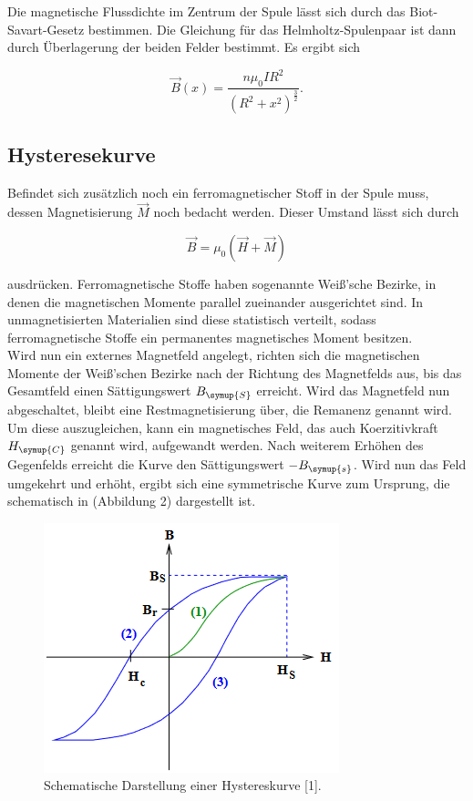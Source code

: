 \documentclass[
  bibliography=totoc,     %
  captions=tableheading,  %
  titlepage=firstiscover, %
]{scrartcl}
\begin{document}
  Die magnetische Flussdichte im Zentrum der Spule lässt sich durch das Biot-Savart-Gesetz bestimmen.
  Die Gleichung für das Helmholtz-Spulenpaar ist dann durch Überlagerung der beiden Felder bestimmt.
  Es ergibt sich
  
  \begin{equation}
    \label{eqn:helmholtz}
    \vec{B}(x) = \frac{n\mu_0 I R^2}{(R^2+x^2)^{\frac{3}{2}}}.
  \end{equation}

  \subsection{Hysteresekurve}
  \label{sec:hysterese}
  
  Befindet sich zusätzlich noch ein ferromagnetischer Stoff in der Spule muss, dessen Magnetisierung $\vec{M}$
  noch bedacht werden. Dieser Umstand lässt sich durch
  
  \begin{equation}
    \vec{B} = \mu_0 (\vec{H} + \vec{M})
  \end{equation}
  
  ausdrücken. Ferromagnetische Stoffe haben sogenannte Weiß'sche Bezirke, in denen die magnetischen
  Momente parallel zueinander ausgerichtet sind. In unmagnetisierten Materialien sind diese statistisch verteilt,
  sodass ferromagnetische Stoffe ein permanentes magnetisches Moment besitzen.\\
  Wird nun ein externes Magnetfeld angelegt, richten sich die magnetischen Momente der Weiß'schen Bezirke
  nach der Richtung des Magnetfelds aus, bis das Gesamtfeld einen Sättigungswert 
  $B_{\symup{S}}$ erreicht. Wird das Magnetfeld nun abgeschaltet, bleibt eine Restmagnetisierung
  über, die Remanenz genannt wird. Um diese auszugleichen, kann ein magnetisches Feld, das
  auch Koerzitivkraft $H_{\symup{C}}$ genannt wird, aufgewandt werden. Nach weiterem Erhöhen des Gegenfelds
  erreicht die Kurve den Sättigungswert $-B_{\symup{s}}$. Wird nun das Feld umgekehrt und erhöht, ergibt sich eine
  symmetrische Kurve zum Ursprung, die schematisch in (Abbildung 2) dargestellt ist.
  
  \begin{figure}
    \centering
    \includegraphics[scale=0.5]{hysterese.png}
    \caption{Schematische Darstellung einer Hystereskurve [1].}
    \label{fig:hysterese}
  \end{figure}
  \FloatBarrier
\end{document}
